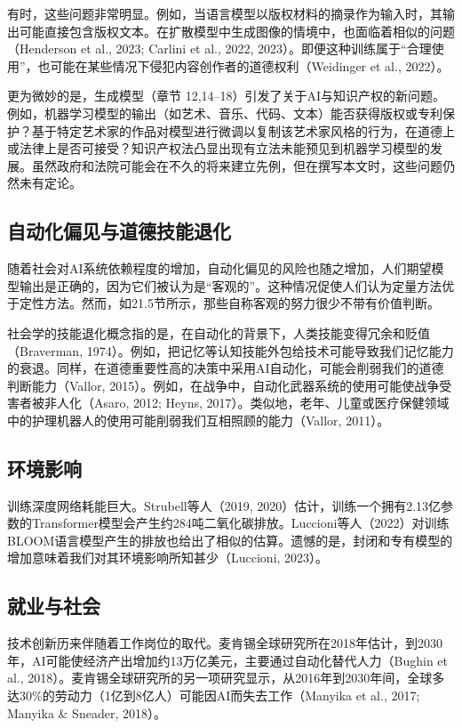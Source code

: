 \documentclass[lang=cn,newtx,10pt,scheme=chinese]{elegantbook}
\begin{document}
有时，这些问题非常明显。例如，当语言模型以版权材料的摘录作为输入时，其输出可能直接包含版权文本。在扩散模型中生成图像的情境中，也面临着相似的问题（Henderson et al., 2023; Carlini et al., 2022, 2023）。即便这种训练属于“合理使用”，也可能在某些情况下侵犯内容创作者的道德权利（Weidinger et al., 2022）。

更为微妙的是，生成模型（章节 12,14–18）引发了关于AI与知识产权的新问题。例如，机器学习模型的输出（如艺术、音乐、代码、文本）能否获得版权或专利保护？基于特定艺术家的作品对模型进行微调以复制该艺术家风格的行为，在道德上或法律上是否可接受？知识产权法凸显出现有立法未能预见到机器学习模型的发展。虽然政府和法院可能会在不久的将来建立先例，但在撰写本文时，这些问题仍然未有定论。

\subsection{自动化偏见与道德技能退化}
随着社会对AI系统依赖程度的增加，自动化偏见的风险也随之增加，人们期望模型输出是正确的，因为它们被认为是“客观的”。这种情况促使人们认为定量方法优于定性方法。然而，如21.5节所示，那些自称客观的努力很少不带有价值判断。

社会学的技能退化概念指的是，在自动化的背景下，人类技能变得冗余和贬值（Braverman, 1974）。例如，把记忆等认知技能外包给技术可能导致我们记忆能力的衰退。同样，在道德重要性高的决策中采用AI自动化，可能会削弱我们的道德判断能力（Vallor, 2015）。例如，在战争中，自动化武器系统的使用可能使战争受害者被非人化（Asaro, 2012; Heyns, 2017）。类似地，老年、儿童或医疗保健领域中的护理机器人的使用可能削弱我们互相照顾的能力（Vallor, 2011）。

\subsection{环境影响}
训练深度网络耗能巨大。Strubell等人（2019, 2020）估计，训练一个拥有2.13亿参数的Transformer模型会产生约284吨二氧化碳排放。Luccioni等人（2022）对训练BLOOM语言模型产生的排放也给出了相似的估算。遗憾的是，封闭和专有模型的增加意味着我们对其环境影响所知甚少（Luccioni, 2023）。

\subsection{就业与社会}
技术创新历来伴随着工作岗位的取代。麦肯锡全球研究所在2018年估计，到2030年，AI可能使经济产出增加约13万亿美元，主要通过自动化替代人力（Bughin et al., 2018）。麦肯锡全球研究所的另一项研究显示，从2016年到2030年间，全球多达30\%的劳动力（1亿到8亿人）可能因AI而失去工作（Manyika et al., 2017; Manyika \& Sneader, 2018）。
\end{document}
